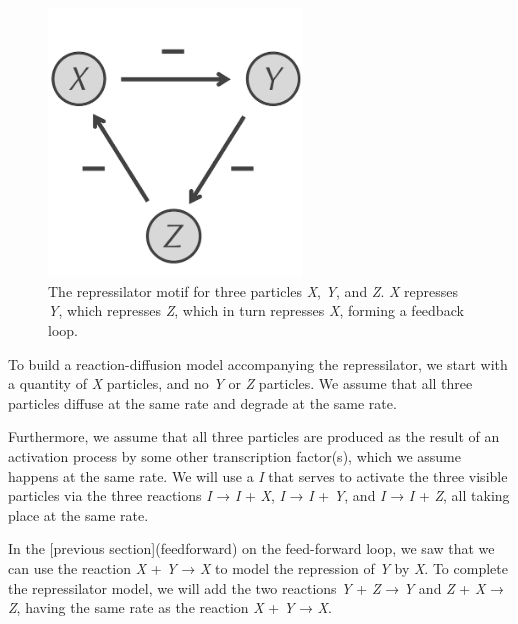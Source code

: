 \begin{figure}[h]
\centering
\mySfFamily
\includegraphics[width = 0.6\textwidth]{../assets/images/600px/repressilator.png}
\caption{The repressilator motif for three particles \textit{X}, \textit{Y}, and \textit{Z}. \textit{X} represses \textit{Y}, which represses \textit{Z}, which in turn represses \textit{X}, forming a feedback loop.}
\label{fig:repressilator}
\end{figure}

\begin{qbox}\end{qbox} 

To build a reaction-diffusion model accompanying the repressilator, we start with a quantity of \textit{X} particles, and no \textit{Y} or \textit{Z} particles. We assume that all three particles diffuse at the same rate and degrade at the same rate.

Furthermore, we assume that all three particles are produced as the result of an activation process by some other transcription factor(s), which we assume happens at the same rate. We will use a  \textit{I} that serves to activate the three visible particles via the three reactions \textit{I} → \textit{I} + \textit{X}, \textit{I} → \textit{I} + \textit{Y}, and \textit{I} → \textit{I} + \textit{Z}, all taking place at the same rate.

In the [previous section](feedforward) on the feed-forward loop, we saw that we can use the reaction \textit{X} + \textit{Y} → \textit{X} to model the repression of \textit{Y} by \textit{X}. To complete the repressilator model, we will add the two reactions \textit{Y} + \textit{Z} → \textit{Y} and \textit{Z} + \textit{X} → \textit{Z}, having the same rate as the reaction \textit{X} + \textit{Y} → \textit{X}.

